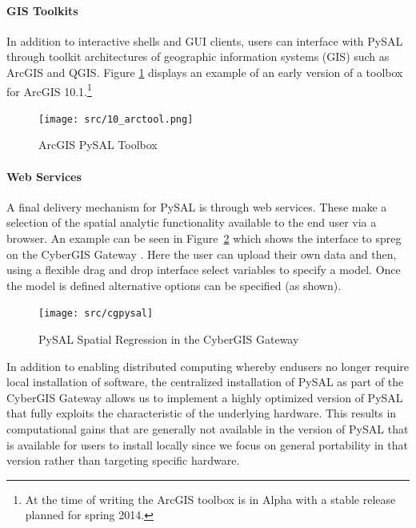 \documentclass[11pt, titlepage]{article}
\begin{document}
\paragraph{GIS Toolkits}

In addition to interactive shells and GUI clients, users can interface
with PySAL through toolkit architectures of geographic information
systems (GIS) such as ArcGIS and QGIS. Figure \ref{f:arcgis} displays an example of an
early version of a toolbox for ArcGIS 10.1.\footnote{At the time of
  writing the ArcGIS toolbox is in Alpha with a stable release planned
  for spring 2014.}


\begin{figure}[ht]
\begin{center}
\texttt{[image: src/10\_arctool.png]}
\end{center}
\caption{ArcGIS PySAL Toolbox}
\label{f:arcgis}
\end{figure}   


\paragraph{Web Services}

A final delivery mechanism for PySAL is through web services. These make
a selection of the spatial analytic functionality available to the end
user via a browser. An example can be seen in Figure~\ref{f:cgpysal}
which shows the interface to spreg on the CyberGIS Gateway \citep{Wang:2010sg}.
Here the user can upload their own data and then, using a flexible drag
and drop interface select variables to
specify a model. Once the model is defined alternative options can be
specified (as shown). 

\begin{figure}[ht]
\begin{center}
\texttt{[image: src/cgpysal]}
\end{center}
\caption{PySAL Spatial Regression in the CyberGIS Gateway}
\label{f:cgpysal}
\end{figure}   

In addition to enabling distributed computing whereby endusers no longer
require local installation of software, the centralized installation of
PySAL as part of the CyberGIS Gateway allows us to implement a highly
optimized version of PySAL that fully exploits the characteristic of the
underlying hardware. This results in computational gains that are
generally not available in the version of PySAL that is available for
users to install locally since we focus on general portability in that
version rather than targeting specific hardware. 
\end{document}
